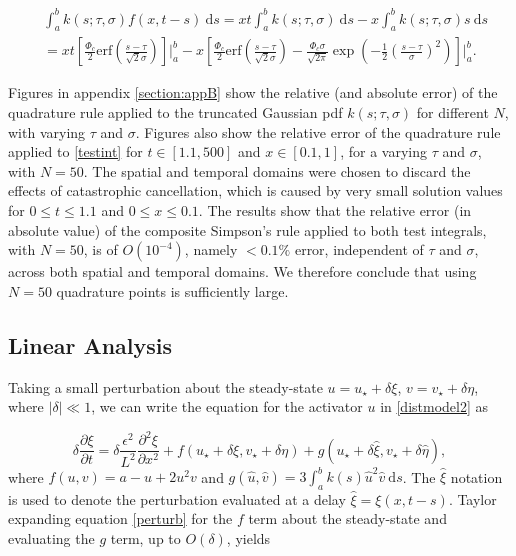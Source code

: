 \begin{equation}
    \begin{split}
&\int_a^bk(s;\tau,\sigma)f(x,t-s)\ \text{d}s=xt\int_a^bk(s;\tau,\sigma)\ \text{d}s-x\int_a^bk(s;\tau,\sigma)s\ \text{d}s\\&=xt\left[\frac{\Phi_c}{2}\text{erf}\left(\frac{s-\tau}{\sqrt{2}\sigma}\right)\right]\bigg|_a^b-x\left[\frac{\Phi_c}{2}\text{erf}\left(\frac{s-\tau}{\sqrt{2}\sigma}\right)-\frac{\Phi_c\sigma}{\sqrt{2\pi}}\exp\left(-\frac{1}{2}\left(\frac{s-\tau}{\sigma}\right)^2 \right)\right]\Bigg|_a^b.
    \end{split}
\end{equation}

Figures in appendix \ref{section:appB} show the relative (and absolute error) of the quadrature rule applied to the truncated Gaussian pdf $k(s;\tau,\sigma)$ for different $N$, with varying $\tau$ and $\sigma$. Figures also show the relative error of the quadrature rule applied to \eqref{testint} for $t\in[1.1,500]$ and $x\in[0.1,1]$, for a varying $\tau$ and $\sigma$, with $N=50$. The spatial and temporal domains were chosen to discard the effects of catastrophic cancellation, which is caused by very small solution values for $0\leq t\leq 1.1$ and $0\leq x\leq 0.1$. The results show that the relative error (in absolute value) of the composite Simpson's rule applied to both test integrals, with $N=50$, is of $O(10^{-4})$, namely $<0.1\%$ error, independent of $\tau$ and $\sigma$, across both spatial and temporal domains. We therefore conclude that using $N=50$ quadrature points is sufficiently large.


\subsection{Linear Analysis}\label{section:distlin}
Taking a small perturbation about the steady-state $u=u_\star+\delta\xi$, $v=v_\star+\delta\eta$, where $|\delta|\ll1$, we can write the equation for the activator $u$ in \eqref{distmodel2} as

\begin{equation}\label{perturb}
  \delta\frac{\partial \xi}{\partial t}=\delta \frac{\epsilon^2}{L^2}\frac{\partial^2\xi}{\partial x^2}+f(u_\star+\delta\xi, v_\star+\delta\eta)+g(u_\star+\delta\hat{\xi},v_\star+\delta\hat{\eta}) ,
\end{equation}
where $f(u,v)=a-u+2u^2v$ and $g(\hat{u},\hat{v})=3\int_a^bk(s)\hat{u}^2\hat{v}\ \text{d}s$. The $\hat{\xi}$ notation is used to denote the perturbation evaluated at a delay $\hat{\xi}=\xi(x,t-s)$. Taylor expanding equation \eqref{perturb} for the $f$ term about the steady-state and evaluating the $g$ term, up to $O(\delta)$, yields


